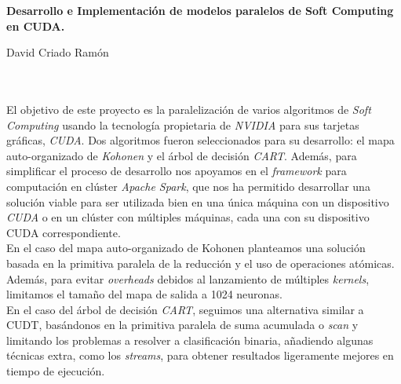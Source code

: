 

%



\cleardoublepage
\thispagestyle{empty}

\begin{center}
{\large\bfseries Desarrollo e Implementación de modelos paralelos de Soft Computing en CUDA.}\\
\end{center}
\begin{center}
David Criado Ramón\\
\end{center}

\\

\vspace{0.7cm}
\\

El objetivo de este proyecto es la paralelización de varios algoritmos de \textit{Soft Computing} usando la tecnología propietaria de \textit{NVIDIA} para sus tarjetas gráficas, \textit{CUDA}. Dos algoritmos fueron seleccionados para su desarrollo: el mapa auto-organizado de \textit{Kohonen} y el árbol de decisión \textit{CART}. Además, para simplificar el proceso de desarrollo nos apoyamos en el \textit{framework} para computación en clúster \textit{Apache Spark}, que nos ha permitido desarrollar una solución viable para ser utilizada bien en una única máquina con un dispositivo \textit{CUDA} o en un clúster con múltiples máquinas, cada una con su dispositivo CUDA correspondiente.\\

En el caso del mapa auto-organizado de Kohonen planteamos una solución basada en la primitiva paralela de la reducción y el uso de operaciones atómicas. Además, para evitar \textit{overheads} debidos al lanzamiento de múltiples \textit{kernels}, limitamos el tamaño del mapa de salida a 1024 neuronas. \\

En el caso del árbol de decisión \textit{CART}, seguimos una alternativa similar a CUDT, basándonos en la primitiva paralela de suma acumulada o \textit{scan} y limitando los problemas a resolver a clasificación binaria, añadiendo algunas técnicas extra, como los \textit{streams}, para obtener resultados ligeramente mejores en tiempo de ejecución. \\

